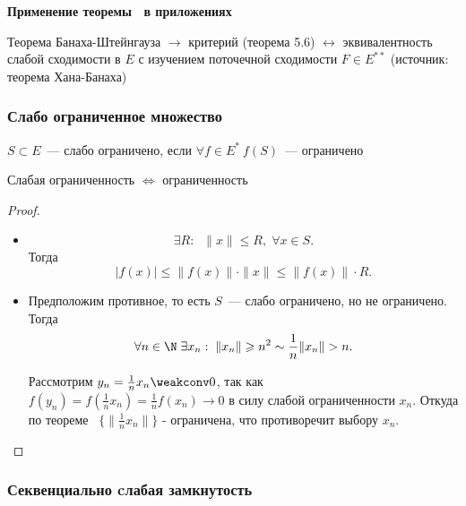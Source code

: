 \textbf{Применение теоремы~ в приложениях}

Теорема Банаха-Штейнгауза $\to$ критерий (теорема 5.6) $\leftrightarrow$ эквивалентность слабой сходимости в $E$ с изучением поточечной сходимости $F \in E^{**}$ (источник:  теорема Хана-Банаха)

\subsubsection{Слабо ограниченное множество}

\begin{definition}
    $S \subset E$~--- слабо ограничено, если $\forall f \in E^* \: f(S)$~--- ограничено
\end{definition}

\begin{statement}\label{han}
    Слабая ограниченность $\Leftrightarrow$ ограниченность
\end{statement}

\begin{proof}
\begin{itemize}
    \item[$\Leftarrow$]
    \[\exists R :\;\; \|x\| \leq R,\; \forall x \in S.\]
    Тогда \[|f(x)| \leq \|f(x)\| \cdot \|x\| \leq \|f(x)\| \cdot R.\]
    \item[$\Rightarrow$] Предположим противное, то есть $S$~--- слабо ограничено, но не ограничено. Тогда
    \[\forall n \in \N\; \exists x_n: \;  \| x_n \| \geqslant n^2 \sim \frac1 n \| x_n \| > n.\]

    Рассмотрим $y_n = \frac 1 n x_n \weakconv 0$, так как $f(y_n) = f(\frac 1 n x_n ) =\frac{1}{n} f(x_n) \to 0$ в силу слабой ограниченности $x_n$. Откуда по теореме~ $\{ \| \frac 1 n x_n \| \}$ - ограничена, что противоречит выбору $x_n$.
\end{itemize}
\end{proof}

\subsubsection{Секвенциально cлабая замкнутость}

